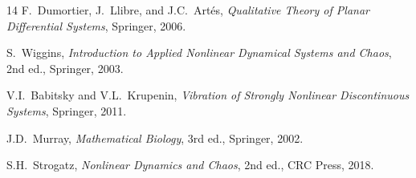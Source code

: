 \documentclass[11pt,a4paper]{article}
\begin{document}
\begin{thebibliography}{14}
F.\ Dumortier, J.\ Llibre, and J.C.\ Art\'es, \textit{Qualitative Theory of Planar Differential Systems}, Springer, 2006.

S.\ Wiggins, \textit{Introduction to Applied Nonlinear Dynamical Systems and Chaos}, 2nd ed., Springer, 2003.

V.I.\ Babitsky and V.L.\ Krupenin, \textit{Vibration of Strongly Nonlinear Discontinuous Systems}, Springer, 2011.

J.D.\ Murray, \textit{Mathematical Biology}, 3rd ed., Springer, 2002.

S.H.\ Strogatz, \textit{Nonlinear Dynamics and Chaos}, 2nd ed., CRC Press, 2018.

\end{thebibliography}
\end{document}
